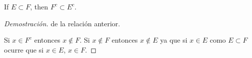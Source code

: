\item If $E \subset F$, then $F^c \subset E^c$.

\begin{proof}[Demostración] de la relación anterior.

    Si $x \in F^c$ entonces $x \not \in F$. Si $x \not \in F$ entonces $x \not \in E$ ya que si $x \in E$ como $E \subset F$ ocurre que si $x \in E$, $x \in F$.
\end{proof}
